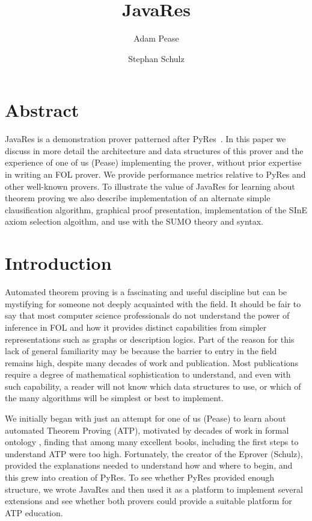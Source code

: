 \documentclass{llncs}
\title{JavaRes}
\author{Adam Pease\inst{2}
        \and Stephan Schulz\inst{1}
  }
\institute{
  Articulate Software, USA,
  \email{\tt apease@articulatesoftware.com}
  \and
  DHBW Stuttgart, Germany,
  \email{\tt schulz@eprover.org}
}
\begin{document}
\maketitle

\section{Abstract}
JavaRes is a demonstration prover patterned after
PyRes~\cite{SP:IJCAR-2020}.  In this paper we discuss in more detail
the architecture and data structures of this prover and the experience
of one of us (Pease) implementing the prover, without prior expertise
in writing an FOL prover.  We provide performance metrics relative to
PyRes and other well-known provers.  To illustrate the value of
JavaRes for learning about theorem proving we also describe
implementation of an alternate simple clausification algorithm,
graphical proof presentation, implementation of the SInE axiom
selection algoithm, and use with the SUMO theory and syntax.


\section{Introduction}

Automated theorem proving is a fascinating and useful discipline but
can be mystifying for someone not deeply acquainted with the field.
It should be fair to say that most computer science professionals do
not understand the power of inference in FOL and how it provides
distinct capabilities from simpler representations such as graphs or
description logics.  Part of the reason for this lack of general
familiarity may be because the barrier to entry in the field remains
high, despite many decades of work and publication.  Most publications
require a degree of mathematical sophistication to understand, and
even with such capability, a reader will not know which data
structures to use, or which of the many algorithms will be simplest or best to
implement.

We initially began with just an attempt for one of us (Pease) to learn
about automated Theorem Proving (ATP), motivated by decades of work in formal ontology \cite{np01,p11},
finding that among many excellent books, including \cite{Harrison:HPL-2009}
the first steps to understand ATP were too high.  Fortunately, the
creator of the Eprover (Schulz), provided the explanations needed to
understand how and where to begin, and this grew into creation of
PyRes.  To see whether PyRes provided enough structure, we wrote
JavaRes and then used it as a platform to implement several extensions
and see whether both provers could provide a suitable platform for ATP
education.
\end{document}
